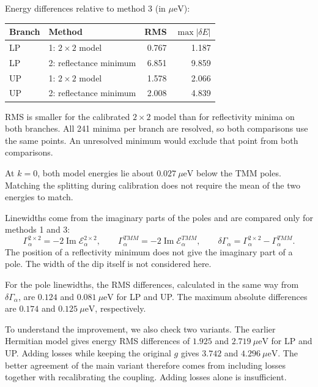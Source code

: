 \documentclass[12pt,a4paper]{article}
\begin{document}
\par\noindent\begin{minipage}{\textwidth}
Energy differences relative to method 3 (in $\mu\mathrm{eV}$):
\begin{center}\small\begin{tabular}{llrr}\toprule
Branch & Method & RMS & $\max|\delta E|$ \\\midrule
LP & 1: $2\times2$ model & 0.767 & 1.187 \\
LP & 2: reflectance minimum & 6.851 & 9.859 \\
UP & 1: $2\times2$ model & 1.578 & 2.066 \\
UP & 2: reflectance minimum & 2.008 & 4.839 \\
\bottomrule\end{tabular}\end{center}
\end{minipage}\par

RMS is smaller for the calibrated $2\times2$ model than for reflectivity minima on both branches. All 241 minima per branch are resolved, so both comparisons use the same points. An unresolved minimum would exclude that point from both comparisons.

At $k=0$, both model energies lie about $0.027\ \mu\mathrm{eV}$ below the TMM poles. Matching the splitting during calibration does not require the mean of the two energies to match.

\par\noindent\begin{minipage}{\textwidth}
Linewidths come from the imaginary parts of the poles and are compared only for methods 1 and 3:
\[
\Gamma_\alpha^{2\times2}=-2\operatorname{Im}\mathcal E_\alpha^{2\times2},
\qquad \Gamma_\alpha^{TMM}=-2\operatorname{Im}\mathcal E_\alpha^{TMM},
\qquad \delta\Gamma_\alpha=\Gamma_\alpha^{2\times2}-\Gamma_\alpha^{TMM}.
\]
The position of a reflectivity minimum does not give the imaginary part of a pole. The width of the dip itself is not considered here.
\end{minipage}\par

For the pole linewidths, the RMS differences, calculated in the same way from $\delta\Gamma_\alpha$, are $0.124$ and $0.081\ \mu\mathrm{eV}$ for LP and UP. The maximum absolute differences are $0.174$ and $0.125\ \mu\mathrm{eV}$, respectively.

To understand the improvement, we also check two variants. The earlier Hermitian model gives energy RMS differences of $1.925$ and $2.719\ \mu\mathrm{eV}$ for LP and UP. Adding losses while keeping the original $g$ gives $3.742$ and $4.296\ \mu\mathrm{eV}$. The better agreement of the main variant therefore comes from including losses together with recalibrating the coupling. Adding losses alone is insufficient.
\end{document}
